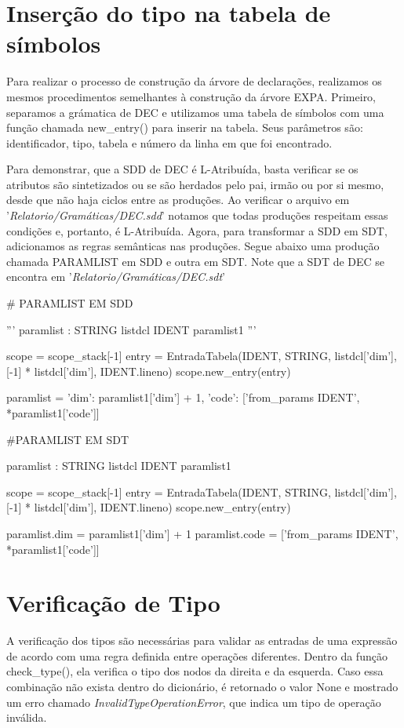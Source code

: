 \documentclass[
	12pt,				%
	openright,			%
	twoside,			%
	a4paper,			%
	english,			%
	french,				%
	spanish,			%
	brazil				%
	]{abntex2}
\begin{document}
\section{Inserção do tipo na tabela de símbolos}
Para realizar o processo de construção da árvore de declarações,
realizamos os mesmos procedimentos semelhantes à construção da árvore EXPA.
Primeiro, separamos a grámatica de DEC e utilizamos uma tabela de símbolos 
com uma função chamada new\_entry() para inserir na tabela. Seus parâmetros são: identificador, tipo, tabela e número da linha
em que foi encontrado.

Para demonstrar, que a SDD de DEC é L-Atribuída, basta verificar se os atributos são
sintetizados ou se são herdados pelo pai, irmão ou por si mesmo, desde que não haja ciclos entre as produções.
Ao verificar o arquivo em '\emph{Relatorio/Gramáticas/DEC.sdd}' notamos que todas produções respeitam essas condições e, portanto,
é L-Atribuída. Agora, para transformar a SDD em SDT, adicionamos as regras semânticas nas produções.
Segue abaixo uma produção chamada PARAMLIST em SDD e outra em SDT. Note que a SDT de DEC se encontra em 
'\emph{Relatorio/Gramáticas/DEC.sdt}'

\begin{python}
# PARAMLIST EM SDD

'''
paramlist : STRING listdcl IDENT paramlist1 
'''

scope = scope_stack[-1]
entry = EntradaTabela(IDENT, STRING, listdcl['dim'], [-1] * listdcl['dim'], IDENT.lineno)
scope.new_entry(entry)

paramlist = { 'dim': paramlist1['dim'] + 1, 'code': ['from_params {IDENT}', *paramlist1['code']] }    
\end{python}

\begin{python}
#PARAMLIST EM SDT

paramlist : STRING listdcl IDENT paramlist1 {
    scope = scope_stack[-1]
    entry = EntradaTabela(IDENT, STRING, listdcl['dim'], [-1] * listdcl['dim'], IDENT.lineno)
    scope.new_entry(entry)

    paramlist.dim = paramlist1['dim'] + 1
    paramlist.code = ['from_params {IDENT}', *paramlist1['code']]
}

\end{python}
\section{Verificação de Tipo}
A verificação dos tipos são necessárias para validar as entradas de uma expressão
de acordo com uma regra definida entre operações diferentes. Dentro da função
check\_type(), ela verifica o tipo dos nodos da direita e da esquerda. Caso essa combinação
não exista dentro do dicionário, é retornado o valor None e mostrado um erro chamado
\emph{InvalidTypeOperationError}, que indica um tipo de operação inválida.
\end{document}
